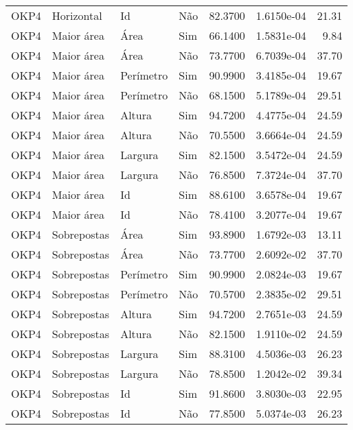 \begin{tabular}{llllrrr}
OKP4      & Horizontal  & Id        & Não         & 82.3700      & 1.6150e-04 & 21.31    \\
OKP4      & Maior área  & Área      & Sim         & 66.1400      & 1.5831e-04 & 9.84     \\
OKP4      & Maior área  & Área      & Não         & 73.7700      & 6.7039e-04 & 37.70    \\
OKP4      & Maior área  & Perímetro & Sim         & 90.9900      & 3.4185e-04 & 19.67    \\
OKP4      & Maior área  & Perímetro & Não         & 68.1500      & 5.1789e-04 & 29.51    \\
OKP4      & Maior área  & Altura    & Sim         & 94.7200      & 4.4775e-04 & 24.59    \\
OKP4      & Maior área  & Altura    & Não         & 70.5500      & 3.6664e-04 & 24.59    \\
OKP4      & Maior área  & Largura   & Sim         & 82.1500      & 3.5472e-04 & 24.59    \\
OKP4      & Maior área  & Largura   & Não         & 76.8500      & 7.3724e-04 & 37.70    \\
OKP4      & Maior área  & Id        & Sim         & 88.6100      & 3.6578e-04 & 19.67    \\
OKP4      & Maior área  & Id        & Não         & 78.4100      & 3.2077e-04 & 19.67    \\
OKP4      & Sobrepostas & Área      & Sim         & 93.8900      & 1.6792e-03 & 13.11    \\
OKP4      & Sobrepostas & Área      & Não         & 73.7700      & 2.6092e-02 & 37.70    \\
OKP4      & Sobrepostas & Perímetro & Sim         & 90.9900      & 2.0824e-03 & 19.67    \\
OKP4      & Sobrepostas & Perímetro & Não         & 70.5700      & 2.3835e-02 & 29.51    \\
OKP4      & Sobrepostas & Altura    & Sim         & 94.7200      & 2.7651e-03 & 24.59    \\
OKP4      & Sobrepostas & Altura    & Não         & 82.1500      & 1.9110e-02 & 24.59    \\
OKP4      & Sobrepostas & Largura   & Sim         & 88.3100      & 4.5036e-03 & 26.23    \\
OKP4      & Sobrepostas & Largura   & Não         & 78.8500      & 1.2042e-02 & 39.34    \\
OKP4      & Sobrepostas & Id        & Sim         & 91.8600      & 3.8030e-03 & 22.95    \\
OKP4      & Sobrepostas & Id        & Não         & 77.8500      & 5.0374e-03 & 26.23    \\
\hline
\end{tabular}